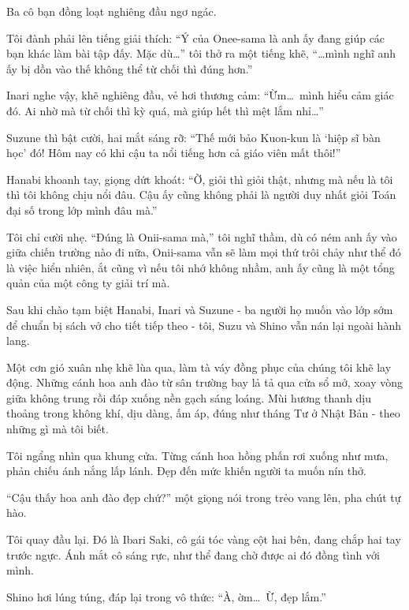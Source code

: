 \documentclass[../main.tex]{subfiles}
\begin{document}
Ba cô bạn đồng loạt nghiêng đầu ngơ ngác.

Tôi đành phải lên tiếng giải thích: ``Ý của Onee-sama là anh ấy đang giúp các bạn khác làm bài tập đấy. Mặc dù\dots'' tôi thở ra một tiếng khẽ, ``\dots mình nghĩ anh ấy bị dồn vào thế không thể từ chối thì đúng hơn.''

Inari nghe vậy, khẽ nghiêng đầu, vẻ hơi thương cảm: ``Ừm\dots\ mình hiểu cảm giác đó. Ai nhờ mà từ chối thì kỳ quá, mà giúp hết thì mệt lắm nhỉ\dots''

Suzune thì bật cười, hai mắt sáng rỡ: ``Thế mới bảo Kuon-kun là `hiệp sĩ bàn học' đó! Hôm nay có khi cậu ta nổi tiếng hơn cả giáo viên mất thôi!''

Hanabi khoanh tay, giọng dứt khoát: ``Ờ, giỏi thì giỏi thật, nhưng mà nếu là tôi thì tôi không chịu nổi đâu. Cậu ấy cũng không phải là người duy nhất giỏi Toán đại số trong lớp mình đâu mà.''

Tôi chỉ cười nhẹ. ``Đúng là Onii-sama mà,'' tôi nghĩ thầm, dù có ném anh ấy vào giữa chiến trường nào đi nữa, Onii-sama vẫn sẽ làm mọi thứ trôi chảy như thể đó là việc hiển nhiên, ắt cũng vì nếu tôi nhớ không nhầm, anh ấy cũng là một tổng quản của một công ty giải trí mà.

\ct


Sau khi chào tạm biệt Hanabi, Inari và Suzune - ba người họ muốn vào lớp sớm để chuẩn bị sách vở cho tiết tiếp theo - tôi, Suzu và Shino vẫn nán lại ngoài hành lang.

Một cơn gió xuân nhẹ khẽ lùa qua, làm tà váy đồng phục của chúng tôi khẽ lay động. Những cánh hoa anh đào từ sân trường bay lả tả qua cửa sổ mở, xoay vòng giữa không trung rồi đáp xuống nền gạch sáng loáng. Mùi hương thanh dịu thoảng trong không khí, dịu dàng, ấm áp, đúng như tháng Tư ở Nhật Bản - theo những gì mà tôi biết.


Tôi ngẩng nhìn qua khung cửa. Từng cánh hoa hồng phấn rơi xuống như mưa, phản chiếu ánh nắng lấp lánh. Đẹp đến mức khiến người ta muốn nín thở.

``Cậu thấy hoa anh đào đẹp chứ?'' một giọng nói trong trẻo vang lên, pha chút tự hào.

Tôi quay đầu lại. Đó là Ibari Saki, cô gái tóc vàng cột hai bên, đang chắp hai tay trước ngực. Ánh mắt cô sáng rực, như thể đang chờ được ai đó đồng tình với mình.

Shino hơi lúng túng, đáp lại trong vô thức: ``À, ờm\dots\ Ừ, đẹp lắm.''
\end{document}
